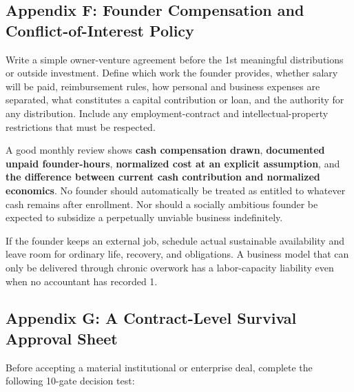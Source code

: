 \subsection*{Appendix F: Founder Compensation and Conflict-of-Interest Policy}

Write a simple owner-venture agreement before the 1st meaningful distributions or outside investment. Define which work the founder provides, whether salary will be paid, reimbursement rules, how personal and business expenses are separated, what constitutes a capital contribution or loan, and the authority for any distribution. Include any employment-contract and intellectual-property restrictions that must be respected.

A good monthly review shows \textbf{cash compensation drawn}, \textbf{documented unpaid founder-hours}, \textbf{normalized cost at an explicit assumption}, and \textbf{the difference between current cash contribution and normalized economics}. No founder should automatically be treated as entitled to whatever cash remains after enrollment. Nor should a socially ambitious founder be expected to subsidize a perpetually unviable business indefinitely.

If the founder keeps an external job, schedule actual sustainable availability and leave room for ordinary life, recovery, and obligations. A business model that can only be delivered through chronic overwork has a labor-capacity liability even when no accountant has recorded 1.

\subsection*{Appendix G: A Contract-Level Survival Approval Sheet}

Before accepting a material institutional or enterprise deal, complete the following 10-gate decision test:

